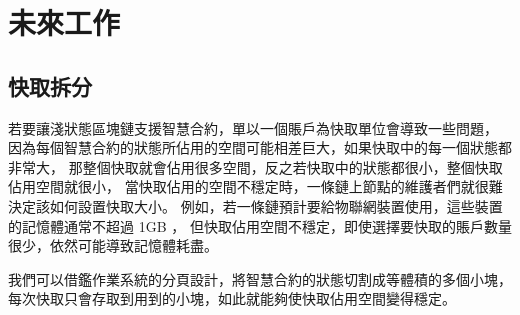 \chapter{未來工作}
\label{c:future_work}

\section{快取拆分}

若要讓淺狀態區塊鏈支援智慧合約，單以一個賬戶為快取單位會導致一些問題，
因為每個智慧合約的狀態所佔用的空間可能相差巨大，如果快取中的每一個狀態都非常大，
那整個快取就會佔用很多空間，反之若快取中的狀態都很小，整個快取佔用空間就很小，
當快取佔用的空間不穩定時，一條鏈上節點的維護者們就很難決定該如何設置快取大小。
例如，若一條鏈預計要給物聯網裝置使用，這些裝置的記憶體通常不超過 1GB ，
但快取佔用空間不穩定，即使選擇要快取的賬戶數量很少，依然可能導致記憶體耗盡。

我們可以借鑑作業系統的分頁設計，將智慧合約的狀態切割成等體積的多個小塊，
每次快取只會存取到用到的小塊，如此就能夠使快取佔用空間變得穩定。

